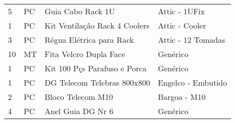 \begin{table}[h!]
\begin{tabular}{llll}
5   & PC   & Guia Cabo Rack 1U             & Attic - 1UFix           \\
1   & PC   & Kit Ventilação Rack 4 Coolers & Attic - Cooler          \\
3   & PC   & Régua Elétrica para Rack      & Attic - 12 Tomadas      \\
10  & MT   & Fita Velcro Dupla Face        & Genérico                \\
1   & PC   & Kit 100 Pçs Parafuso e Porca  & Genérico                \\
1   & PC   & DG Telecom Telebras 800x800   & Engelco - Embutido      \\
2   & PC   & Bloco Telecom M10             & Bargoa - M10            \\
4   & PC   & Anel Guia DG Nr 6             & Genérico               
\end{tabular}
\end{table}